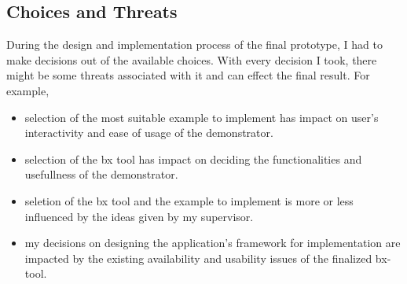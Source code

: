 \subsection{Choices and Threats}\label{subsec:design_choicesthreats}
During the design and implementation process of the final prototype, I had to make decisions out of the available choices. With every decision I took, there might be some threats associated with it and can effect the final result. For example, 
\begin{itemize} 
	\item {selection of the most suitable example to implement has impact on user's interactivity and ease of usage of the demonstrator.}
	\item {selection of the bx tool has impact on deciding the functionalities and usefullness of the demonstrator.}
	\item {seletion of the bx tool and the example to implement is more or less influenced by the ideas given by my supervisor.} 
	\item {my decisions on designing the application's framework for implementation are impacted by the existing availability and usability issues of the finalized bx-tool.}
\end{itemize}

